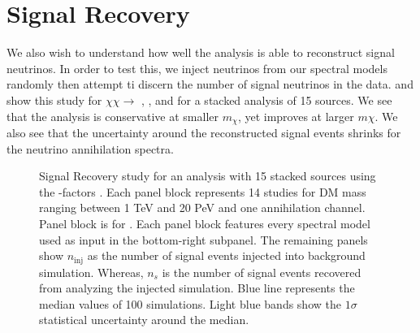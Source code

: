\section{Signal Recovery} \label{sec:icDM_sig_recovery}

We also wish to understand how well the analysis is able to reconstruct signal neutrinos.
In order to test this, we inject neutrinos from our spectral models randomly then attempt ti discern the number of signal neutrinos in the data.
 and  show this study for $\chi\chi \rightarrow$ , , and \parpar{\nu_\mu} for a stacked analysis of 15 sources.
We see that the analysis is conservative at smaller $m_\chi$, yet improves at larger $m\chi$.
We also see that the uncertainty around the reconstructed signal events shrinks for the neutrino annihilation spectra.

\begin{figure}[t]
    \caption{Signal Recovery study for an analysis with 15 stacked sources using the \GS \J-factors \cite{Geringer_Sameth_2015}. Each panel block represents 14 studies for DM mass ranging between 1 TeV and 20 PeV and one annihilation channel. Panel block is for . Each panel block features every spectral model used as input in the bottom-right subpanel. The remaining panels show $n_\mathrm{inj}$ as the number of signal events injected into background simulation. Whereas, $n_s$ is the number of signal events recovered from analyzing the injected simulation. Blue line represents the median values of 100 simulations. Light blue bands show the $1\sigma$ statistical uncertainty around the median.}
    \label{fig:icDM_sigrecovery_1of2}
\end{figure}

